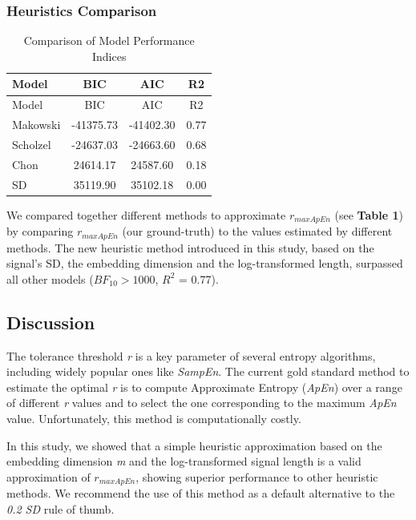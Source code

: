 \documentclass[
  man,floatsintext]{apa6}
\begin{document}
\hypertarget{heuristics-comparison}{%
\subsubsection{Heuristics Comparison}\label{heuristics-comparison}}

\begin{longtable}[]{@{}lccc@{}}
\caption{Comparison of Model Performance Indices}\tabularnewline
\toprule()
Model & BIC & AIC & R2 \\
\midrule()
\endfirsthead
\toprule()
Model & BIC & AIC & R2 \\
\midrule()
\endhead
Makowski & -41375.73 & -41402.30 & 0.77 \\
Scholzel & -24637.03 & -24663.60 & 0.68 \\
Chon & 24614.17 & 24587.60 & 0.18 \\
SD & 35119.90 & 35102.18 & 0.00 \\
\bottomrule()
\end{longtable}

We compared together different methods to approximate \(r_{maxApEn}\) (see \textbf{Table 1}) by comparing \(r_{maxApEn}\) (our ground-truth) to the values estimated by different methods. The new heuristic method introduced in this study, based on the signal's SD, the embedding dimension and the log-transformed length, surpassed all other models (\(BF_{10} > 1000\), \(R^2\) = 0.77).

\hypertarget{discussion}{%
\subsection{Discussion}\label{discussion}}

The tolerance threshold \emph{r} is a key parameter of several entropy algorithms, including widely popular ones like \emph{SampEn}. The current gold standard method to estimate the optimal \emph{r} is to compute Approximate Entropy (\emph{ApEn}) over a range of different \emph{r} values and to select the one corresponding to the maximum \emph{ApEn} value. Unfortunately, this method is computationally costly.

In this study, we showed that a simple heuristic approximation based on the embedding dimension \emph{m} and the log-transformed signal length is a valid approximation of \(r_{maxApEn}\), showing superior performance to other heuristic methods.
We recommend the use of this method as a default alternative to the \emph{0.2 SD} rule of thumb.
\end{document}
